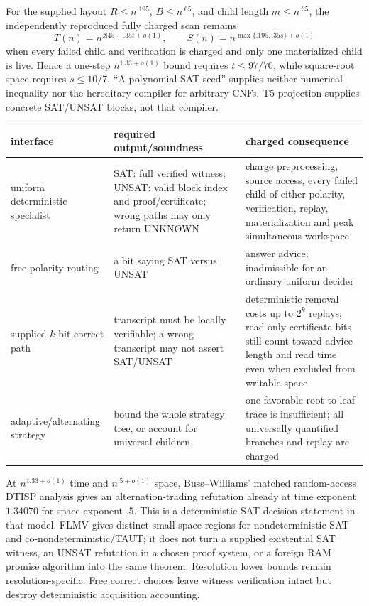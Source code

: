 \documentclass[11pt]{article}
\begin{document}
For the supplied layout $R\le n^{.195}$, $B\le n^{.65}$, and child length $m\le n^{.35}$, the independently reproduced fully charged scan remains
\[
T(n)=n^{.845+.35t+o(1)},\qquad
S(n)=n^{\max\{.195,.35s\}+o(1)}
\]
when every failed child and verification is charged and only one materialized child is live.  Hence a one-step $n^{1.33+o(1)}$ bound requires $t\le97/70$, while square-root space requires $s\le10/7$.  ``A polynomial SAT seed'' supplies neither numerical inequality nor the hereditary compiler for arbitrary CNFs.  T5 projection supplies concrete SAT/UNSAT blocks, not that compiler.

\begin{center}
\small
\begin{tabular}{p{.18\linewidth}p{.35\linewidth}p{.37\linewidth}}
\toprule
interface & required output/soundness & charged consequence\\\midrule
uniform deterministic specialist & SAT: full verified witness; UNSAT: valid block index and proof/certificate; wrong paths may only return UNKNOWN & charge preprocessing, source access, every failed child of either polarity, verification, replay, materialization and peak simultaneous workspace\\
free polarity routing & a bit saying SAT versus UNSAT & answer advice; inadmissible for an ordinary uniform decider\\
supplied $k$-bit correct path & transcript must be locally verifiable; a wrong transcript may not assert SAT/UNSAT & deterministic removal costs up to $2^k$ replays; read-only certificate bits still count toward advice length and read time even when excluded from writable space\\
adaptive/alternating strategy & bound the whole strategy tree, or account for universal children & one favorable root-to-leaf trace is insufficient; all universally quantified branches and replay are charged\\
\bottomrule
\end{tabular}
\end{center}

At $n^{1.33+o(1)}$ time and $n^{.5+o(1)}$ space, Buss--Williams' matched random-access DTISP analysis gives an alternation-trading refutation already at time exponent $1.34070$ for space exponent $.5$.  This is a deterministic SAT-decision statement in that model.  FLMV gives distinct small-space regions for nondeterministic SAT and co-nondeterministic/TAUT; it does not turn a supplied existential SAT witness, an UNSAT refutation in a chosen proof system, or a foreign RAM promise algorithm into the same theorem.  Resolution lower bounds remain resolution-specific.  Free correct choices leave witness verification intact but destroy deterministic acquisition accounting.
\end{document}
